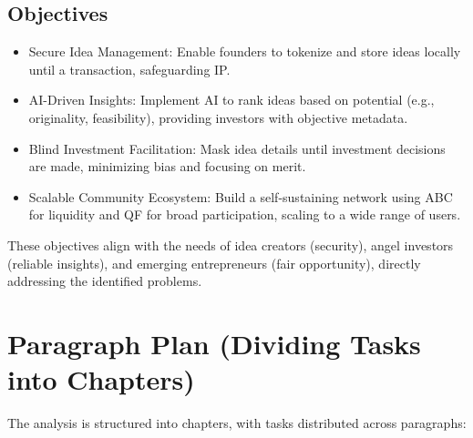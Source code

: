 \documentclass[12pt]{article}
\begin{document}
\subsection{Objectives}
\begin{itemize}
  \item Secure Idea Management: Enable founders to tokenize and store ideas locally until a transaction, safeguarding IP.
  \item AI-Driven Insights: Implement AI to rank ideas based on potential (e.g., originality, feasibility), providing investors with objective metadata.
  \item Blind Investment Facilitation: Mask idea details until investment decisions are made, minimizing bias and focusing on merit.
  \item Scalable Community Ecosystem: Build a self-sustaining network using ABC for liquidity and QF for broad participation, scaling to a wide range of users.
\end{itemize}

These objectives align with the needs of idea creators (security), angel investors (reliable insights), and emerging entrepreneurs (fair opportunity), directly addressing the identified problems.

\section{Paragraph Plan (Dividing Tasks into Chapters)}

The analysis is structured into chapters, with tasks distributed across paragraphs:
\end{document}
